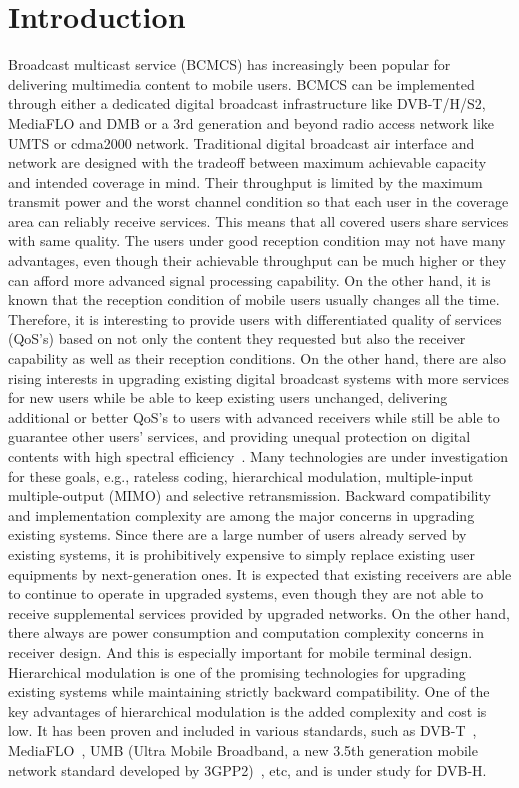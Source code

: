 \documentclass[conference]{IEEEtran}
\begin{document}
\section{Introduction}
Broadcast multicast service (BCMCS) has increasingly been popular
for delivering multimedia content to mobile users. BCMCS can be
implemented through either a dedicated digital broadcast
infrastructure like DVB-T/H/S2, MediaFLO and DMB or a 3rd
generation and beyond radio access network like UMTS or cdma2000
network. Traditional digital broadcast air interface and network
are designed with the tradeoff between maximum achievable capacity
and intended coverage in mind. Their throughput is limited by the
maximum transmit power and the worst channel condition so that
each user in the coverage area can reliably receive services. This
means that all covered users share services with same quality. The
users under good reception condition may not have many advantages,
even though their achievable throughput can be much higher or they
can afford more advanced signal processing capability. On the
other hand, it is known that the reception condition of mobile
users usually changes all the time. Therefore, it is interesting
to provide users with differentiated quality of services (QoS's)
based on not only the content they requested but also the receiver
capability as well as their reception conditions. On the other
hand, there are also rising interests in upgrading existing
digital broadcast systems with more services for new users while
be able to keep existing users unchanged, delivering additional or
better QoS's to users with advanced receivers while still be able
to guarantee other users' services, and providing unequal
protection on digital contents with high spectral
efficiency~\cite{DVB,MediaFLO,Jiang05,UMB}. Many technologies are
under investigation for these goals, e.g., rateless coding,
hierarchical modulation, multiple-input multiple-output (MIMO) and
selective retransmission. Backward compatibility and
implementation complexity are among the major concerns in
upgrading existing systems. Since there are a large number of
users already served by existing systems, it is prohibitively
expensive to simply replace existing user equipments by
next-generation ones. It is expected that existing receivers are
able to continue to operate in upgraded systems, even though they
are not able to receive supplemental services provided by upgraded
networks. On the other hand, there always are power consumption
and computation complexity concerns in receiver design. And this
is especially important for mobile terminal design. Hierarchical
modulation is one of the promising technologies for upgrading
existing systems while maintaining strictly backward
compatibility. One of the key advantages of hierarchical
modulation is the added complexity and cost is low. It has been
proven and included in various standards, such as
DVB-T~\cite{DVB}, MediaFLO~\cite{MediaFLO}, UMB (Ultra Mobile
Broadband, a new 3.5th generation mobile network standard
developed by 3GPP2)~\cite{UMB}, etc, and is under study for DVB-H.
\end{document}
